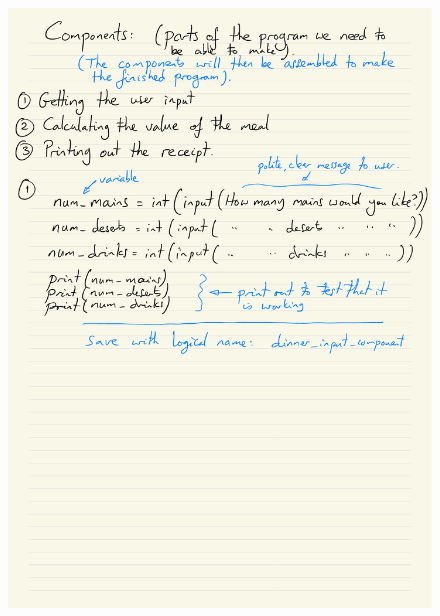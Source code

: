 \documentclass[a4paper,12pt]{article}
\begin{document}
\begin{figure} [!h]
	\centering
	\includegraphics[width=12cm]{iterative_processes/Components_detailed_p1.pdf}
\end{figure}
\end{document}
